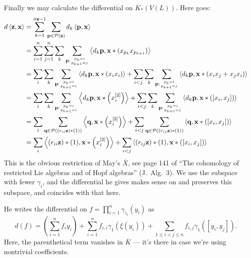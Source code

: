 \documentclass[11pt]{article}
\begin{document}
\begin{PRlieKoszulComplexCalculation}
Finally we may calculate the differential on $\overline{K}_*(V(L))$. Here goes:
\begin{alignat*}{2}
d\left\langle \textbf{z},\textbf{x}\right\rangle
&=
\sum_{k=1}^{\sigma\textbf{z}-1}\sum_{\textbf{p}\in\calP(\textbf{z})}d_k\left\langle \textbf{p},\textbf{x}\right\rangle%
\\
&=
\sum_{i=1}^{n}\sum_{j=1}^{n}\sum_{k}\sum_{\textbf{p}:{p_k=i\atop p_{k+1}=j}}\left\langle d_k\textbf{p},\textbf{x}*(x_{p_k}x_{p_{k+1}})\right\rangle%
\\
&=
\sum_{i}\sum_{k}\sum_{\textbf{p}:{p_k=i\atop p_{k+1}=i}}\left\langle d_k\textbf{p},\textbf{x}*(x_ix_i)\right\rangle+\sum_{i<j}\sum_{k}\sum_{\textbf{p}:{p_k=i\atop p_{k+1}=j}}\left\langle d_k\textbf{p},\textbf{x}*(x_ix_j+x_jx_i)\right\rangle%
\\
&=
\sum_{i}\sum_{k}\sum_{\textbf{p}:{p_k=i\atop p_{k+1}=i}}\left\langle d_k\textbf{p},\textbf{x}*\left(x_i^{[2]}\right)\right\rangle+\sum_{i<j}\sum_{k}\sum_{\textbf{p}:{p_k=i\atop p_{k+1}=j}}\left\langle d_k\textbf{p},\textbf{x}*\left([x_i,x_j]\right)\right\rangle%
\\
&=
\sum_{i}\sum_{\textbf{q}\in\calP((r_{ii}\textbf{z})*(1))}\left\langle \textbf{q},\textbf{x}*\left(x_i^{[2]}\right)\right\rangle+\sum_{i<j} \sum_{\textbf{q}\in\calP((r_{ij}\textbf{z})*(1))}\left\langle \textbf{q},\textbf{x}*\left([x_i,x_j]\right)\right\rangle%
\\
&=
\sum_{i}\left\langle (r_{ii}\textbf{z})*(1),\textbf{x}*\left(x_i^{[2]}\right)\right\rangle+\sum_{i<j} \left\langle (r_{ij}\textbf{z})*(1),\textbf{x}*\left([x_i,x_j]\right)\right\rangle%
\end{alignat*}
This is the obvious restriction of May's $\overline{X}$, see page 141 of ``The cohomology of restricted Lie algebras and of Hopf algebras'' (J.\ Alg.\ 3). We use the subspace with fewer $\gamma_i$, and the differential he gives makes sense on and preserves this subspace, and coincides with that here.

He writes the differential on $f=\prod_{i=1}^{n}\gamma_{z_i}(y_i)$ as
\[d(f)=\left(\sum_{i=1}^{n}f_iy_i\right)+ \sum_{i=1}^{n}f_{i,i}\gamma_1(\xi(y_i))+\sum_{1\leq i<j\leq n}f_{i,j}\gamma_1([y_i,y_j]).\]
Here, the parenthetical term vanishes in $\overline{K}$ --- it's there in case we're using nontrivial coefficients.
\end{PRlieKoszulComplexCalculation}

\printbibliography
\end{document}
